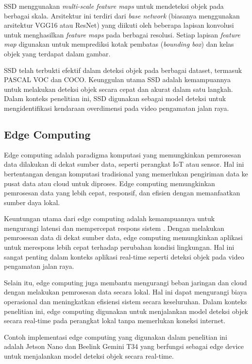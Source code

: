 SSD menggunakan \emph{multi-scale feature maps} untuk mendeteksi objek pada berbagai skala. Arsitektur ini terdiri dari \emph{base network} (biasanya menggunakan arsitektur VGG16 atau ResNet) yang diikuti oleh beberapa lapisan konvolusi untuk menghasilkan \emph{feature maps} pada berbagai resolusi. Setiap lapisan \emph{feature map} digunakan untuk memprediksi kotak pembatas (\emph{bounding box}) dan kelas objek yang terdapat dalam gambar.

SSD telah terbukti efektif dalam deteksi objek pada berbagai dataset, termasuk PASCAL VOC dan COCO. Keunggulan utama SSD adalah kemampuannya untuk melakukan deteksi objek secara cepat dan akurat dalam satu langkah. Dalam konteks penelitian ini, SSD digunakan sebagai model deteksi untuk mengidentifikasi kendaraan overdimensi pada video pengamatan jalan raya.

\subsection{Edge Computing}

Edge computing adalah paradigma komputasi yang memungkinkan pemrosesan data dilakukan di dekat sumber data, seperti perangkat IoT atau sensor. Hal ini bertentangan dengan komputasi tradisional yang memerlukan pengiriman data ke pusat data atau cloud untuk diproses. Edge computing memungkinkan pemrosesan data yang lebih cepat, responsif, dan efisien dengan memanfaatkan sumber daya lokal.

Keuntungan utama dari edge computing adalah kemampuannya untuk mengurangi latensi dan mempercepat respons sistem \parencite*{aws2024}. Dengan melakukan pemrosesan data di dekat sumber data, edge computing memungkinkan aplikasi untuk merespons lebih cepat terhadap perubahan kondisi lingkungan. Hal ini sangat penting dalam konteks aplikasi real-time seperti deteksi objek pada video pengamatan jalan raya.

Selain itu, edge computing juga membantu mengurangi beban jaringan dan cloud dengan melakukan pemrosesan data secara lokal. Hal ini dapat mengurangi biaya operasional dan meningkatkan efisiensi sistem secara keseluruhan. Dalam konteks penelitian ini, edge computing digunakan untuk menjalankan model deteksi objek secara real-time pada perangkat lokal tanpa memerlukan koneksi internet. 

Contoh implementasi edge computing yang digunakan dalam penelitian ini adalah Jetson Nano dan Beelink Gemini T34  yang berfungsi sebagai edge device untuk menjalankan model deteksi objek secara real-time.


